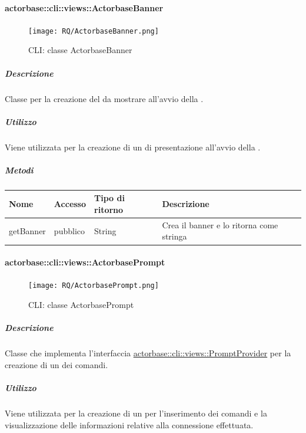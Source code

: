 \documentclass{scalatekids-article}
\begin{document}
\paragraph{actorbase::cli::views::ActorbaseBanner}
\label{sec:actorbase::cli::views::ActorbaseBanner}

\begin{figure}[H]
  \begin{center}
    \texttt{[image: RQ/ActorbaseBanner.png]}
    \caption{CLI: classe ActorbaseBanner}
  \end{center}
\end{figure}

\subparagraph{Descrizione}

Classe per la creazione del  da mostrare all'avvio della
.

\subparagraph{Utilizzo}

Viene utilizzata per la creazione di un  di presentazione
all'avvio della .

\subparagraph{Metodi}

\begin{tabular}{| l | l | l | l |}
  \hline
  Nome & Accesso & Tipo di ritorno & Descrizione\\
  \hline
  getBanner & pubblico & String & Crea il banner e lo ritorna come stringa\\
  \hline
\end{tabular}

\paragraph{actorbase::cli::views::ActorbasePrompt}
\label{sec:actorbase::cli::views::ActorbasePrompt}

\begin{figure}[H]
  \begin{center}
    \texttt{[image: RQ/ActorbasePrompt.png]}
    \caption{CLI: classe ActorbasePrompt}
  \end{center}
\end{figure}

\subparagraph{Descrizione}

Classe che implementa l'interfaccia \hyperref[sec:actorbase::cli::views::PromptProvider]{actorbase::cli::views::PromptProvider} per
la creazione di un  dei comandi.

\subparagraph{Utilizzo}

Viene utilizzata per la creazione di un  per l'inserimento dei
comandi e la visualizzazione delle informazioni relative alla connessione
effettuata.
\end{document}
